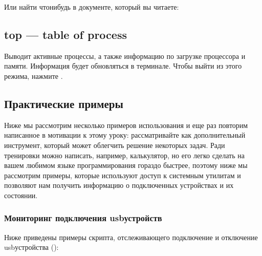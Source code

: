 \documentclass[letterpaper,10pt,russian]{sphinxmanual}
\begin{document}
\sphinxAtStartPar
Или найти что\sphinxhyphen{}нибудь в документе, который вы читаете:

\sphinxAtStartPar
{}

\sphinxAtStartPar
{}


\subsection{top — table of process}
\label{\detokenize{educational_materials/bash/content:top-table-of-process}}
\sphinxAtStartPar
Выводит активные процессы, а также информацию по загрузке процессора и памяти. Информация будет обновляться в терминале. Чтобы выйти из этого режима, нажмите .

\sphinxAtStartPar
{}

\sphinxAtStartPar
{}


\subsection{Практические примеры}
\label{\detokenize{educational_materials/bash/content:id4}}
\sphinxAtStartPar
Ниже мы рассмотрим несколько примеров использования  и еще раз повторим написанное в мотивации к этому уроку: рассматривайте  как дополнительный инструмент, который может облегчить решение некоторых задач. Ради тренировки можно написать, например, калькулятор, но его легко сделать на вашем любимом языке программирования гораздо быстрее, поэтому ниже мы рассмотрим примеры, которые используют доступ к системным утилитам и позволяют нам получить информацию о подключенных устройствах и их состоянии.


\subsubsection{Мониторинг подключения usb\sphinxhyphen{}устройств}
\label{\detokenize{educational_materials/bash/content:usb}}
\sphinxAtStartPar
Ниже приведены примеры скрипта, отслеживающего подключение и отключение usb\sphinxhyphen{}устройства ():
\end{document}
